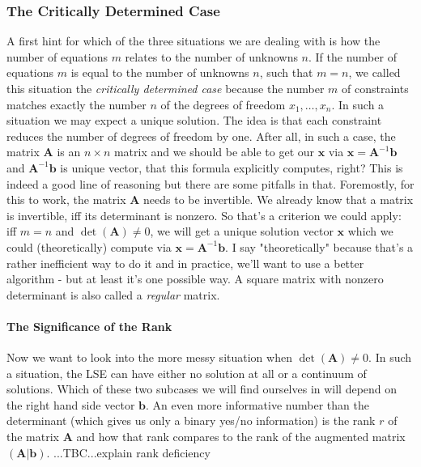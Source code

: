 
\subsubsection{The Critically Determined Case}
A first hint for which of the three situations we are dealing with is how the number of equations $m$ relates to the number of unknowns $n$. If the number of equations $m$ is equal to the number of unknowns $n$, such that $m=n$, we called this situation the \emph{critically determined case} because the number $m$ of constraints matches exactly the number $n$ of the degrees of freedom $x_1, \ldots, x_n$. In such a situation we may expect a unique solution. The idea is that each constraint reduces the number of degrees of freedom by one. After all, in such a case, the matrix $\mathbf{A}$ is an $n \times n$ matrix and we should be able to get our $\mathbf{x}$ via $\mathbf{x} = \mathbf{A}^{-1} \mathbf{b}$ and $\mathbf{A}^{-1} \mathbf{b}$ is unique vector, that this formula explicitly computes, right? This is indeed a good line of reasoning but there are some pitfalls in that. Foremostly, for this to work, the matrix $\mathbf{A}$ needs to be invertible. We already know that a matrix is invertible, iff its determinant is nonzero. So that's a criterion we could apply: iff $m = n$ and $\det(\mathbf{A}) \neq 0$, we will get a unique solution vector $\mathbf{x}$ which we could (theoretically) compute via $\mathbf{x} = \mathbf{A}^{-1} \mathbf{b}$. I say "theoretically" because that's a rather inefficient way to do it and in practice, we'll want to use a better algorithm - but at least it's one possible way. A square matrix with nonzero determinant is also called a \emph{regular} matrix.

\paragraph{The Significance of the Rank}
Now we want to look into the more messy situation when $\det(\mathbf{A}) \neq 0$. In such a situation, the LSE can have either no solution at all or a continuum of solutions. Which of these two subcases we will find ourselves in will depend on the right hand side vector $\mathbf{b}$. An even more informative number than the determinant (which gives us only a binary yes/no information) is the rank $r$ of the matrix $\mathbf{A}$ and how that rank compares to the rank of the augmented matrix $(\mathbf{A|b})$. ...TBC...explain rank deficiency

